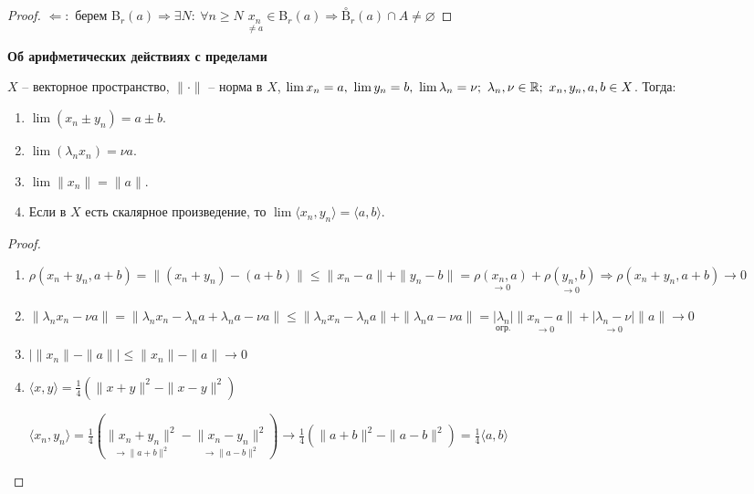 \begin{statement}
\begin{enumerate}
\begin{proof}
            $\Leftarrow:$ берем B$_r(a)\Rightarrow\exists N:\ \forall n\geq N\ \underset{\neq a}{x_n}\in$B$_r(a)\Rightarrow\overset{\circ}{\text{B}}_r(a)\cap A\neq \varnothing$
        \end{proof}
    \end{enumerate}
\end{statement}

\begin{theorem}
    \textbf{Об арифметических действиях с пределами}

    $X$ – векторное пространство, $\|\cdot\|$ – норма в $X$, $\lim x_n=a,\ \lim y_n=b,\ \lim \lambda_n=\nu;\ \lambda_n, \nu\in \mathbb{R};\ x_n, y_n, a, b\in X$. Тогда:
    \begin{enumerate}
        \item $\lim (x_n \pm y_n) = a\pm b$.
        \item $\lim (\lambda_n x_n) = \nu a$.
        \item $\lim \|x_n\|=\|a\|$.
        \item Если в $X$ есть скалярное произведение, то $\lim \langle x_n, y_n\rangle =\langle a, b\rangle$.
    \end{enumerate}
    \begin{proof}~
        \begin{enumerate}
            \item $\rho(x_n+y_n, a+b)=\|(x_n+y_n)-(a+b)\|\leq \|x_n-a\|+\|y_n-b\|=\underset{\rightarrow 0}{\rho(x_n, a)}+\underset{\rightarrow 0}{\rho(y_n, b)}\Rightarrow \rho(x_n+y_n, a+b)\rightarrow 0$
            \item $\|\lambda_nx_n-\nu a\|=\|\lambda_nx_n-\lambda_na+\lambda_na-\nu a\|\leq \|\lambda_nx_n-\lambda_n a\|+\|\lambda_n a-\nu a\|=\underset{\text{огр.}}{|\lambda_n|}\underset{\rightarrow 0}{\|x_n-a\|}+\underset{\rightarrow 0}{|\lambda_n-\nu|}\|a\|\rightarrow 0$
            \item $|\|x_n\|-\|a\||\leq\|x_n\|-\|a\|\rightarrow0$
            \item $\langle x, y\rangle=\frac{1}{4}(\|x+y\|^2-\|x-y\|^2)$
    
            $\langle x_n, y_n\rangle=\frac{1}{4}(\underset{\rightarrow\|a+b\|^2}{\|x_n+y_n\|^2}-\underset{\rightarrow\|a-b\|^2}{\|x_n-y_n\|^2})\rightarrow \frac{1}{4}(\|a+b\|^2-\|a-b\|^2)=\frac{1}{4}\langle a, b\rangle$
        \end{enumerate}
    \end{proof}
\end{theorem}